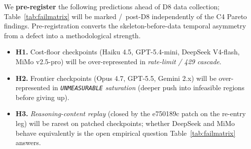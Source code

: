 We \textbf{pre-register} the following predictions ahead of D8
data collection; Table~\ref{tab:failmatrix} will be marked
\yes/\no\ post-D8 independently of the C4 Pareto findings.
Pre-registration converts the skeleton-before-data temporal
asymmetry from a defect into a methodological strength.

\begin{itemize}
  \item \textbf{H1.} Cost-floor checkpoints (Haiku 4.5,
    GPT-5.4-mini, DeepSeek V4-flash, MiMo v2.5-pro) will be
    over-represented in \emph{rate-limit / 429 cascade}.
  \item \textbf{H2.} Frontier checkpoints (Opus 4.7, GPT-5.5,
    Gemini 2.x) will be over-represented in
    \emph{\texttt{UNMEASURABLE} saturation} (deeper push into
    infeasible regions before giving up).
  \item \textbf{H3.} \emph{Reasoning-content replay} (closed by
    the e750189c patch on the re-entry leg) will be rarest on
    patched checkpoints; whether DeepSeek and MiMo behave
    equivalently is the open empirical question
    Table~\ref{tab:failmatrix} answers.
\end{itemize}
